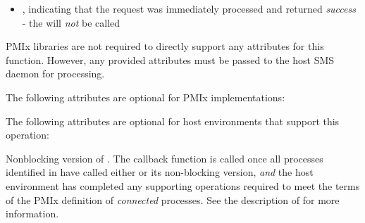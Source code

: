 \begin{arglist}
\end{arglist}

\returnsimplenb

\returnstart
\begin{itemize}
    \item {}, indicating that the request was immediately processed and returned \textit{success} - the  will \textit{not} be called
\end{itemize}
\returnend

\reqattrstart
\ac{PMIx} libraries are not required to directly support any attributes for this function. However, any provided attributes must be passed to the host \ac{SMS} daemon for processing.

\reqattrend

\optattrstart
The following attributes are optional for \ac{PMIx} implementations:



The following attributes are optional for host environments that support this operation:


\optattrend

\descr

Nonblocking version of . The callback function is called once all processes identified in  have called either  or its non-blocking version, \textit{and} the host environment has completed any supporting operations required to meet the terms of the \ac{PMIx} definition of \textit{connected} processes. See the description of  for more information.


\subsection{}

